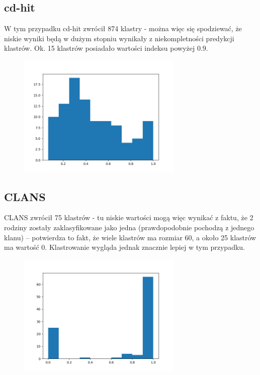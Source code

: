 \documentclass[12pt]{article}
\begin{document}
\subsection{cd-hit}
W tym przypadku cd-hit zwrócił 874 klastry - można więc się spodziewać, że niskie wyniki będą w dużym stopniu wynikały z niekompletności predykcji klastrów.
Ok. 15 klastrów posiadało wartości indeksu powyżej 0.9.
\begin{figure}[H]
\begin{center}
\includegraphics[width=0.7\textwidth]{myplot_cdhit}
\end{center}
\end{figure}


\subsection{CLANS}
CLANS zwrócił 75 klastrów - tu niskie wartości mogą więc wynikać z faktu, że 2 rodziny zostały zaklasyfikowane jako jedna (prawdopodobnie pochodzą z jednego klanu) -- potwierdza to fakt, że wiele klastrów ma rozmiar 60, a około 25 klastrów ma wartość 0.
Klastrowanie wygląda jednak znacznie lepiej w tym przypadku.

\begin{figure}[H]
\begin{center}
\includegraphics[width=0.7\textwidth]{myplot}
\end{center}
\end{figure}
\end{document}
